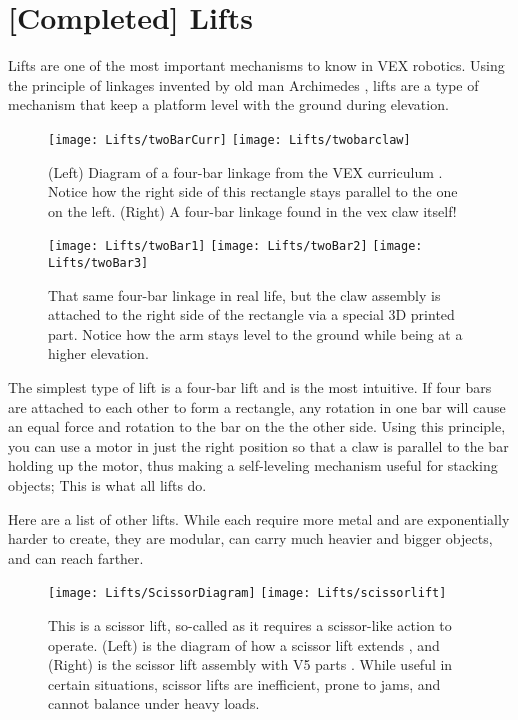 \section{[Completed] Lifts}

Lifts are one of the most important mechanisms to know in VEX robotics. Using the principle of linkages invented by old man Archimedes \cite{Linkage}, lifts are a type of mechanism that keep a platform level with the ground during elevation.

\begin{figure}[h]
    \centering
    \texttt{[image: Lifts/twoBarCurr]}
    \texttt{[image: Lifts/twobarclaw]}
    \caption{
    (Left) Diagram of a four-bar linkage from the VEX curriculum \cite{LinkageCurr}. Notice how the right side of this rectangle stays parallel to the one on the left. (Right) A four-bar linkage found in the vex claw itself!
    }
\end{figure}

\begin{figure}[h]
    \centering
    \texttt{[image: Lifts/twoBar1]}
    \texttt{[image: Lifts/twoBar2]}
    \texttt{[image: Lifts/twoBar3]}
    \caption{
    That same four-bar linkage in real life, but the claw assembly is attached to the right side of the rectangle via a special 3D printed part. Notice how the arm stays level to the ground while being at a higher elevation.
    }
\end{figure}

The simplest type of lift is a four-bar lift and is the most intuitive. If four bars are attached to each other to form a rectangle, any rotation in one bar will cause an equal force and rotation to the bar on the the other side. Using this principle, you can use a motor in just the right position so that a claw is parallel to the bar holding up the motor, thus making a self-leveling mechanism useful for stacking objects; This is what all lifts do.

Here are a list of other lifts. While each require more metal and are exponentially harder to create, they are modular, can carry much heavier and bigger objects, and can reach farther.


\begin{figure}[h]
    \centering
    \texttt{[image: Lifts/ScissorDiagram]}
    \texttt{[image: Lifts/scissorlift]}
    \caption{
    This is a scissor lift, so-called as it requires a scissor-like action to operate. (Left) is the diagram of how a scissor lift extends \cite{ScissorDiagram}, and (Right) is the scissor lift assembly with V5 parts \cite{V5Lifts}. While useful in certain situations, scissor lifts are inefficient, prone to jams, and cannot balance under heavy loads.
    }
\end{figure}


